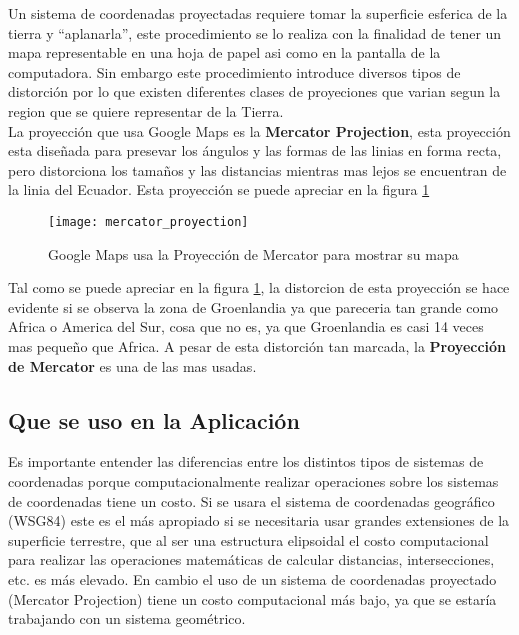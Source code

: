         Un sistema de coordenadas proyectadas requiere tomar la superficie esferica de la tierra y ``aplanarla'', este procedimiento se lo realiza con la finalidad de tener un mapa representable en una hoja de papel asi como en la pantalla de la computadora. Sin embargo este procedimiento introduce diversos tipos de distorci\'on por lo que existen diferentes clases de proyeciones que varian segun la region que se quiere representar de la Tierra.\\

        La proyecci\'on que usa Google Maps es la \textbf{Mercator Projection}, esta proyecci\'on esta dise\~nada para presevar los ángulos y las formas de las linias en forma recta, pero distorciona los tama\~nos y las distancias mientras mas lejos se encuentran de la linia del Ecuador. Esta proyecci\'on se puede apreciar en la figura \ref{fig:mercator_proyection}

        \begin{figure}[!hbp]
          \begin{center}
            \texttt{[image: mercator\_proyection]}
          \end{center}
          \caption[Sistema de coordenadas Proyectadas]{Google Maps usa la Proyección de Mercator para mostrar su mapa} 
          \label{fig:mercator_proyection}
        \end{figure}

        Tal como se puede apreciar en la figura \ref{fig:mercator_proyection}, la distorcion de esta proyecci\'on se hace evidente si se observa la zona de Groenlandia ya que pareceria tan grande como Africa o America del Sur, cosa que no es, ya que Groenlandia es casi 14 veces mas peque\~no que Africa. A pesar de esta distorci\'on tan marcada, la \textbf{Proyección de Mercator} es una de las mas usadas.
      \subsection{Que se uso en la Aplicaci\'on} %
      \label{sec:que_se_uso_en_la_aplicacion}
        Es importante entender las diferencias entre los distintos tipos de sistemas de coordenadas porque computacionalmente realizar operaciones sobre los sistemas de coordenadas tiene un costo.        
        Si se usara el sistema de coordenadas geográfico (WSG84) este es el más apropiado si se necesitaria usar grandes extensiones de la superficie terrestre, que al ser una estructura elipsoidal el costo computacional para realizar las operaciones matemáticas de calcular distancias, intersecciones, etc. es más elevado. En cambio el uso de un sistema de coordenadas proyectado (Mercator Projection) tiene un costo computacional más bajo, ya que se estaría trabajando con un sistema geométrico.\\

